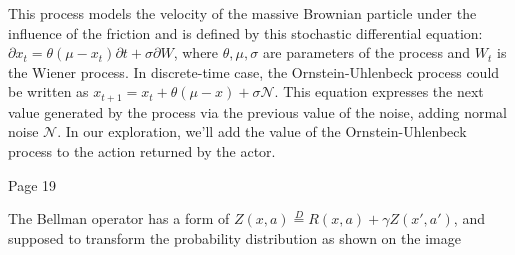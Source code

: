 This process models the velocity of the massive Brownian particle under the
influence of the friction and is defined by this stochastic differential
equation: \begin{math}\partial x_t=\theta(\mu-x_t)\partial t + \sigma\partial W\end{math},
where \begin{math}\theta, \mu, \sigma\end{math} are parameters of the process and \begin{math}W_t\end{math} is the
Wiener process. In discrete-time case, the Ornstein-Uhlenbeck process could be
written as \begin{math}x_{t+1}=x_t + \theta(\mu - x)+\sigma\mathcal{N} \end{math}.
This equation expresses the next value generated by
the process via the previous value of the noise, adding normal noise \begin{math}\mathcal{N}\end{math}.
In our exploration, we’ll add the value of the
Ornstein-Uhlenbeck process to the action returned by the actor.


Page 19

The Bellman operator has a form of
\begin{math}Z(x, a)\stackrel{D}{=} R(x, a) + \gamma Z(x', a')\end{math}, and supposed to transform the probability distribution as shown on the image



